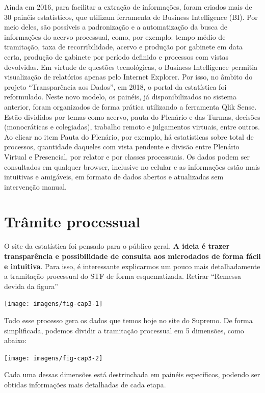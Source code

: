 \documentclass[
]{book}
\begin{document}
Ainda em 2016, para facilitar a extração de informações, foram criados mais de 30 painéis estatísticos, que utilizam ferramenta de Business Intelligence (BI). Por meio deles, são possíveis a padronização e a automatização da busca de informações do acervo processual, como, por exemplo: tempo médio de tramitação, taxa de recorribilidade, acervo e produção por gabinete em data certa, produção de gabinete por período definido e processos com vistas devolvidas.
Em virtude de questões tecnológicas, o Business Intelligence permitia visualização de relatórios apenas pelo Internet Explorer. Por isso, no âmbito do projeto ``Transparência aos Dados'', em 2018, o portal da estatística foi reformulado. Neste novo modelo, os painéis, já disponibilizados no sistema anterior, foram organizados de forma prática utilizando a ferramenta Qlik Sense. Estão divididos por temas como acervo, pauta do Plenário e das Turmas, decisões (monocráticas e colegiadas), trabalho remoto e julgamentos virtuais, entre outros. Ao clicar no item Pauta do Plenário, por exemplo, há estatísticas sobre total de processos, quantidade daqueles com vista pendente e divisão entre Plenário Virtual e Presencial, por relator e por classes processuais. Os dados podem ser consultados em qualquer browser, inclusive no celular e as informações estão mais intuitivas e amigáveis, em formato de dados abertos e atualizadas sem intervenção manual.

\hypertarget{tramite}{%
\chapter{Trâmite processual}\label{tramite}}

O site da estatística foi pensado para o público geral. \textbf{A ideia é trazer transparência e possibilidade de consulta aos microdados de forma fácil e intuitiva}. Para isso, é interessante explicarmos um pouco mais detalhadamente a tramitação processual do STF de forma esquematizada. Retirar ``Remessa devida da figura''

\texttt{[image: imagens/fig-cap3-1]}

Todo esse processo gera os dados que temos hoje no site do Supremo. De forma simplificada, podemos dividir a tramitação processual em 5 dimensões, como abaixo:

\texttt{[image: imagens/fig-cap3-2]}

Cada uma dessas dimensões está destrinchada em painéis específicos, podendo ser obtidas informações mais detalhadas de cada etapa.
\end{document}
